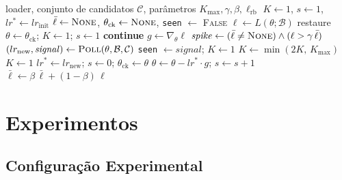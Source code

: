 \documentclass[conference]{IEEEtran}
\begin{document}
\begin{algorithm}[htbp]
\caption{Votação Eficiente (uma época)}
\label{alg:efficient}
\begin{algorithmic}[1]
\REQUIRE loader, conjunto de candidatos $\mathcal{C}$, parâmetros $K_{\max}, \gamma, \beta, \ell_{\mathrm{rb}}$
\STATE $K \leftarrow 1$,\; $s \leftarrow 1$,\; $lr^{*} \leftarrow lr_{\mathrm{init}}$ 
\STATE $\bar{\ell} \leftarrow \textsc{None}$,\; $\theta_{\mathrm{ck}} \leftarrow \textsc{None}$,\; \texttt{seen} $\leftarrow$ \textsc{False}
    \STATE $\ell \leftarrow L(\theta; \mathcal{B})$
        \STATE restaure $\theta \leftarrow \theta_{\mathrm{ck}}$;\; $K \leftarrow 1$;\; $s \leftarrow 1$ 
        \STATE \textbf{continue}
    \ENDIF
    \STATE $g \leftarrow \nabla_\theta \ell$
    \STATE $\mathit{spike} \leftarrow (\bar{\ell} \neq \textsc{None}) \wedge (\ell > \gamma\,\bar{\ell})$ 
        \STATE $(lr_{\mathrm{new}}, \mathit{signal}) \leftarrow \textsc{Poll}(\theta, \mathcal{B}, \mathcal{C})$
            \STATE \texttt{seen} $\leftarrow \mathit{signal}$;\; $K \leftarrow 1$
            \STATE $K \leftarrow \min(2K,\, K_{\max})$ 
        \ELSE
            \STATE $K \leftarrow 1$ 
        \ENDIF
        \STATE $lr^{*} \leftarrow lr_{\mathrm{new}}$;\; $s \leftarrow 0$;\; $\theta_{\mathrm{ck}} \leftarrow \theta$ 
    \ELSE
        \STATE $\theta \leftarrow \theta - lr^{*} \cdot g$;\; $s \leftarrow s + 1$ 
    \ENDIF
    \STATE $\bar{\ell} \leftarrow \beta\,\bar{\ell} + (1-\beta)\,\ell$ 
\ENDFOR
\end{algorithmic}
\end{algorithm}

\section{Experimentos}

\subsection{Configuração Experimental}
\end{document}

